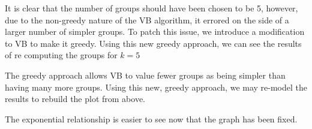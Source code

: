 
It is clear that the number of groups should have been chosen to be 5,
however, due to the non-greedy nature of the VB algorithm, it errored
on the side of a larger number of simpler groups. To patch this issue,
we introduce a modification to VB to make it greedy. Using this new greedy
approach, we can see the results of re computing the groups for $k=5$

\begin{minipage}{\linewidth}
\vspace{10pt}
\end{minipage}

The greedy approach allows VB to value fewer groups as being simpler than
having many more groups. Using this new, greedy approach, we may re-model
the results to rebuild the plot from above.



The exponential relationship is easier to see now that the graph
has been fixed.
